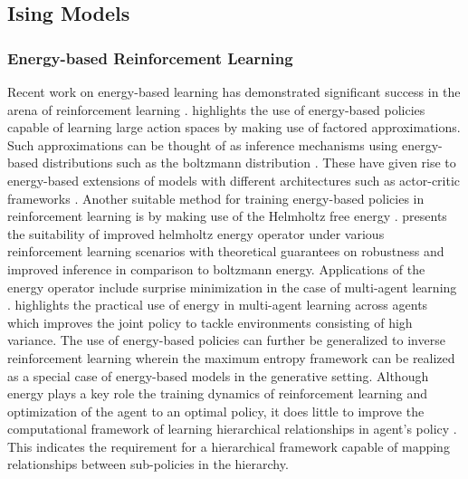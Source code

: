 \documentclass{article}
\begin{document}
\subsection{Ising Models}
\subsubsection{Energy-based Reinforcement Learning}
Recent work on energy-based learning \cite{energy} has demonstrated significant success in the arena of reinforcement learning \cite{curl,rad}. \cite{energy-rl} highlights the use of energy-based policies capable of learning large action spaces by making use of factored approximations. Such approximations can be thought of as inference mechanisms \cite{david} using energy-based distributions such as the boltzmann distribution \cite{overcomplete}. These have given rise to energy-based extensions of models with different architectures such as actor-critic frameworks \cite{ac}. Another suitable method for training energy-based policies in reinforcement learning is by making use of the Helmholtz free energy \cite{sql}. \cite{mellowmax} presents the suitability of improved helmholtz energy operator under various reinforcement learning scenarios with theoretical guarantees on robustness and improved inference in comparison to boltzmann energy. Applications of the energy operator include surprise minimization in the case of multi-agent learning \cite{emix}. \cite{emix} highlights the practical use of energy in multi-agent learning across agents which improves the joint policy to tackle environments consisting of high variance. The use of energy-based policies can further be generalized to inverse reinforcement learning \cite{inverse} wherein the maximum entropy framework can be realized as a special case of energy-based models in the generative setting. Although energy plays a key role the training dynamics of reinforcement learning and optimization of the agent to an optimal policy, it does little to improve the computational framework of learning hierarchical relationships in agent's policy \cite{energy-hier}. This indicates the requirement for a hierarchical framework capable of mapping relationships between sub-policies in the hierarchy. 
\end{document}

